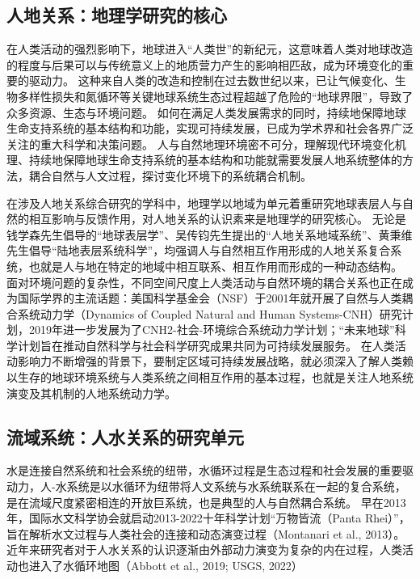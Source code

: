 \subsection{人地关系：地理学研究的核心}

在人类活动的强烈影响下，地球进入“人类世”的新纪元，这意味着人类对地球改造的程度与后果可以与传统意义上的地质营力产生的影响相匹敌，成为环境变化的重要的驱动力\cite{lenton2019, lewis2015, lewis2018}。
这种来自人类的改造和控制在过去数世纪以来，已让气候变化、生物多样性损失和氮循环等关键地球系统生态过程超越了危险的“地球界限”，导致了众多资源、生态与环境问题\cite{steffen2015}。
如何在满足人类发展需求的同时，持续地保障地球生命支持系统的基本结构和功能，实现可持续发展，已成为学术界和社会各界广泛关注的重大科学和决策问题\cite{wu2014}。
人与自然地理环境密不可分，理解现代环境变化机理、持续地保障地球生命支持系统的基本结构和功能就需要发展人地系统整体的方法，耦合自然与人文过程，探讨变化环境下的系统耦合机制\cite{fu2015}。

在涉及人地关系综合研究的学科中，地理学以地域为单元着重研究地球表层人与自然的相互影响与反馈作用，对人地关系的认识素来是地理学的研究核心\cite{wu1991}。
无论是钱学森先生倡导的“地球表层学”、吴传钧先生提出的“人地关系地域系统”、黄秉维先生倡导“陆地表层系统科学”，均强调人与自然相互作用形成的人地关系复合系统，也就是人与地在特定的地域中相互联系、相互作用而形成的一种动态结构。
面对环境问题的复杂性，不同空间尺度上人类活动与自然环境的耦合关系也正在成为国际学界的主流话题\cite{fu2015}：美国科学基金会（NSF）于2001年就开展了自然与人类耦合系统动力学（Dynamics of Coupled Natural and Human Systems-CNH）研究计划，2019年进一步发展为了CNH2-社会-环境综合系统动力学计划；“未来地球”科学计划旨在推动自然科学与社会科学研究成果共同为可持续发展服务。
在人类活动影响力不断增强的背景下，要制定区域可持续发展战略，就必须深入了解人类赖以生存的地球环境系统与人类系统之间相互作用的基本过程，也就是关注人地系统演变及其机制的人地系统动力学\cite{fu2022}。

\subsection{流域系统：人水关系的研究单元}

水是连接自然系统和社会系统的纽带，水循环过程是生态过程和社会发展的重要驱动力，人-水系统是以水循环为纽带将人文系统与水系统联系在一起的复合系统，是在流域尺度紧密相连的开放巨系统，也是典型的人与自然耦合系统\cite{li2007}。
早在2013年，国际水文科学协会就启动2013-2022十年科学计划“万物皆流（Panta Rhei）”，旨在解析水文过程与人类社会的连接和动态演变过程（Montanari et al., 2013）。
近年来研究者对于人水关系的认识逐渐由外部动力演变为复杂的内在过程，人类活动也进入了水循环地图（Abbott et al., 2019; USGS, 2022）

